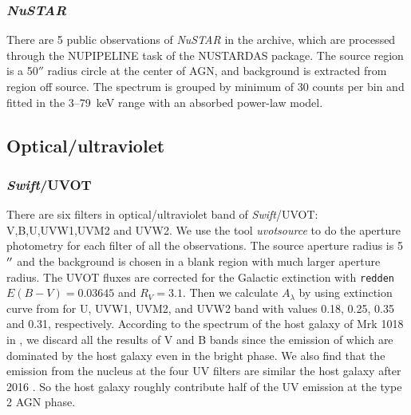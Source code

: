 \documentclass[twocolumn]{aastex63}
\newcommand{\nustar}{{\em NuSTAR }}
\newcommand{\swift}{{\small \it Swift}}
\begin{document}
\subsubsection{\nustar}
There are 5 public observations of \nustar in the archive, which are processed through the {\scriptsize NUPIPELINE} task of the {\scriptsize NUSTARDAS} package. The source region is a 50$''$ radius circle at the center of AGN, and background is extracted from region off source. The spectrum is grouped by minimum of 30 counts per bin and fitted in the 3--79~keV range with an absorbed power-law model.


\subsection{Optical/ultraviolet}
\subsubsection{\swift/UVOT}
\label{sec:uvot}
There are six filters in optical/ultraviolet band of \swift/UVOT: V,B,U,UVW1,UVM2 and UVW2. We use the tool \textit{uvotsource} to do the aperture photometry for each filter of all the observations. The source aperture radius is 5$\mbox{$^{\prime\prime}$}$ and the background is chosen in a blank region with much larger aperture radius. The UVOT fluxes are corrected for the Galactic extinction with \texttt{redden} $E(B-V) = 0.03645$ \citep[see ][]{2018MNRAS.480.3898N} and $R_{V}=3.1$. Then we calculate  $A_{\lambda}$ by using extinction curve from \citet{2007ApJ...663..320F} for U, UVW1, UVM2, and 
UVW2 band with values 0.18, 0.25, 0.35 and 0.31, respectively. According to the spectrum of the host galaxy of Mrk 1018 in \citep{2018MNRAS.480.3898N}, we discard all the results of V and B bands since the emission of which are dominated by the host galaxy even in the bright phase. We also find that the emission from the nucleus at the four UV filters are similar the host galaxy after 2016 \citep{2018MNRAS.480.3898N}. So the host galaxy roughly contribute half of the UV emission at the type 2 AGN phase. 




\end{document}
